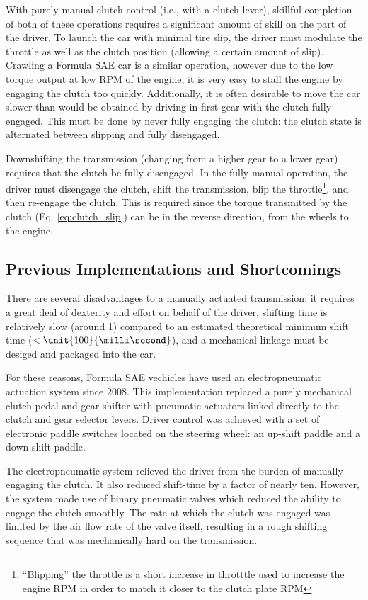 With purely manual clutch control (i.e., with a clutch lever), skillful completion of both of these operations requires a significant amount of skill on the part of the driver. To launch the car with minimal tire slip, the driver must modulate the throttle as well as the clutch position (allowing a certain amount of slip). Crawling a Formula SAE car is a similar operation, however due to the low torque output at low RPM of the engine, it is very easy to stall the engine by engaging the clutch too quickly. Additionally, it is often desirable to move the car slower than would be obtained by driving in first gear with the clutch fully engaged. This must be done by never fully engaging the clutch: the clutch state is alternated between slipping and fully disengaged.

Downshifting the transmission (changing from a higher gear to a lower gear) requires that the clutch be fully disengaged. In the fully manual operation, the driver must disengage the clutch, shift the transmission, blip the throttle\footnote{``Blipping'' the throttle is a short increase in throtttle used to increase the engine RPM in order to match it closer to the clutch plate RPM}, and then re-engage the clutch. This is required since the torque transmitted by the clutch (Eq. \ref{eq:clutch_slip}) can be in the reverse direction, from the wheels to the engine.


\subsection{Previous Implementations and Shortcomings}

There are several disadvantages to a manually actuated transmission: it requires a great deal of dexterity and effort on behalf of the driver, shifting time is relatively slow (around \unit{1}{\second}) compared to an estimated theoretical minimum shift time ($<\unit{100}{\milli\second}$), and a mechanical linkage must be desiged and packaged into the car.

For these reasons, Formula SAE vechicles have used an electropneumatic actuation system since 2008. This implementation replaced a purely mechanical clutch pedal and gear shifter with pneumatic actuators linked directly to the clutch and gear selector levers. Driver control was achieved with a set of electronic paddle switches located on the steering wheel: an up-shift paddle and a down-shift paddle.

The electropneumatic system relieved the driver from the burden of manually engaging the clutch. It also reduced shift-time by a factor of nearly ten. However, the system made use of binary pneumatic valves which reduced the ability to engage the clutch smoothly. The rate at which the clutch was engaged was limited by the air flow rate of the valve itself, resulting in a rough shifting sequence that was mechanically hard on the transmission. 

